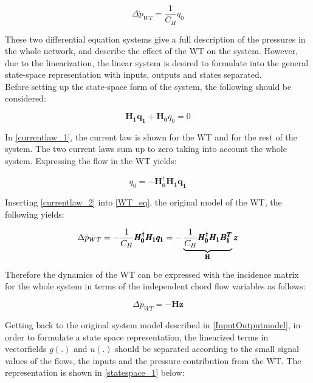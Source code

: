 \begin{equation}
\Delta \dot{p}_{WT} = \frac{1}{C_H} q_0
 \label{WT_eq}
\end{equation}

These two differential equation systems give a full description of the pressures in the whole network, and  describe the effect of the WT on the system. However, due to the linearization, the linear system is desired to formulate into the general state-space representation with inputs, outputs and states separated. 
\\
Before setting up the state-space form of the system, the following should be considered: 

\begin{equation}
 \pmb{H_1}\pmb{q_1} + \pmb{H_0}q_0 = 0 
 \label{currentlaw_1}
\end{equation}

In \eqref{currentlaw_1}, the current law is shown for the WT and for the rest of the system. The two current laws sum up to zero taking into account the whole system. Expressing the flow in the WT yields:

\begin{equation}
q_0 = -\pmb{H^{\dagger}_0}\pmb{H_1}\pmb{q_1}
 \label{currentlaw_2}
\end{equation}

Inserting \eqref{currentlaw_2} into \eqref{WT_eq}, the original model of the WT, the following yields:

\begin{equation}
\Delta \dot{p}_{WT} = - \frac{1}{C_H} \pmb{H^{\dagger}_0}\pmb{H_1}\pmb{q_1} = - \underbrace{\frac{1}{C_H} \pmb{H^{\dagger}_0}\pmb{H_1}\pmb{{B_1^{T}}}}_\text{\pmb{H}} \pmb{z}
 \label{currentlaw_3}
\end{equation}

Therefore the dynamics of the WT can be expressed with the incidence matrix for the whole system in terms of the independent chord flow variables as follows: 

\begin{equation}
\Delta \dot{p}_{WT} = - \pmb{H} \pmb{z}
 \label{currentlaw_4}
\end{equation}

Getting back to the original system model described in \eqref{InputOutputmodel}, in order to formulate a state space representation, the linearized terms in  vectorfields $g(.)$ and $u(.)$ should be separated according to the small signal values of the flows, the inputs and the pressure contribution from the WT. The representation is shown in \eqref{statespace_1} below: 

